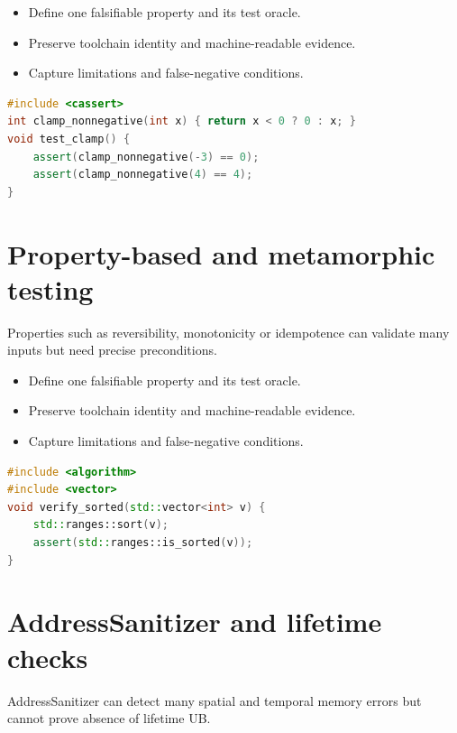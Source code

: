 \documentclass[11pt]{article}
\begin{document}
\begin{itemize}[leftmargin=*,itemsep=1pt,topsep=3pt]
\item Define one falsifiable property and its test oracle.
\item Preserve toolchain identity and machine-readable evidence.
\item Capture limitations and false-negative conditions.
\end{itemize}
\begin{lstlisting}[language=C++]
#include <cassert>
int clamp_nonnegative(int x) { return x < 0 ? 0 : x; }
void test_clamp() {
    assert(clamp_nonnegative(-3) == 0);
    assert(clamp_nonnegative(4) == 4);
}
\end{lstlisting}
\section{Property-based and metamorphic testing}
Properties such as reversibility, monotonicity or idempotence can validate many inputs but need precise preconditions.

\begin{itemize}[leftmargin=*,itemsep=1pt,topsep=3pt]
\item Define one falsifiable property and its test oracle.
\item Preserve toolchain identity and machine-readable evidence.
\item Capture limitations and false-negative conditions.
\end{itemize}
\begin{lstlisting}[language=C++]
#include <algorithm>
#include <vector>
void verify_sorted(std::vector<int> v) {
    std::ranges::sort(v);
    assert(std::ranges::is_sorted(v));
}
\end{lstlisting}
\section{AddressSanitizer and lifetime checks}
AddressSanitizer can detect many spatial and temporal memory errors but cannot prove absence of lifetime UB.
\end{document}
